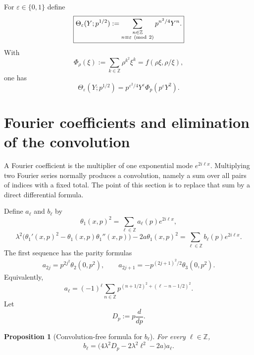 \documentclass[11pt]{article}
\newtheorem{proposition}{Proposition}[section]
\numberwithin{equation}{section}
\newcommand{\Dp}{D_p}
\begin{document}
For $\varepsilon\in\{0,1\}$ define
\begin{equation}
\boxed{\Theta_\varepsilon(Y;p^{1/2})
:=\sum_{\substack{n\in\mathbb Z\\n\equiv\varepsilon\ ({\rm mod}\ 2)}}
p^{n^2/4}Y^n.}
\end{equation}
With
\begin{equation}
\Phi_\rho(\xi):=\sum_{k\in\mathbb Z}\rho^{k^2}\xi^k
=f(\rho\xi,\rho/\xi),
\end{equation}
one has
\begin{equation}
\boxed{\Theta_\varepsilon(Y;p^{1/2})=
p^{\varepsilon^2/4}Y^\varepsilon
\Phi_p(p^\varepsilon Y^2).}
\end{equation}

\section{Fourier coefficients and elimination of the convolution}
A Fourier coefficient is the multiplier of one exponential mode $e^{2i\ell x}$.  Multiplying two Fourier series normally produces a convolution, namely a sum over all pairs of indices with a fixed total.  The point of this section is to replace that sum by a direct differential formula.

Define $a_\ell$ and $b_\ell$ by
\begin{equation}
\theta_1(x,p)^2=\sum_{\ell\in\mathbb Z}a_\ell(p)e^{2i\ell x},
\end{equation}
\begin{equation}
\lambda^2\bigl(\theta_1'(x,p)^2-\theta_1(x,p)\theta_1''(x,p)\bigr)
-2a\theta_1(x,p)^2
=\sum_{\ell\in\mathbb Z}b_\ell(p)e^{2i\ell x}.
\end{equation}
The first sequence has the parity formulas
\begin{equation}
\begin{aligned}
\boxed{a_{2j}=p^{2j^2}\theta_2(0,p^2)},
\qquad
\boxed{a_{2j+1}=-p^{(2j+1)^2/2}\theta_3(0,p^2).}
\end{aligned}
\end{equation}
Equivalently,
\begin{equation}
a_\ell=(-1)^\ell\sum_{n\in\mathbb Z}
p^{(n+1/2)^2+(\ell-n-1/2)^2}.
\end{equation}
Let
\begin{equation}
\boxed{\Dp:=p\frac{d}{dp}}.
\end{equation}

\begin{proposition}[Convolution-free formula for $b_\ell$]
For every $\ell\in\mathbb Z$,
\begin{equation}
\boxed{b_\ell=\bigl(4\lambda^2\Dp-2\lambda^2\ell^2-2a\bigr)a_\ell.}
\end{equation}
\end{proposition}
\end{document}
